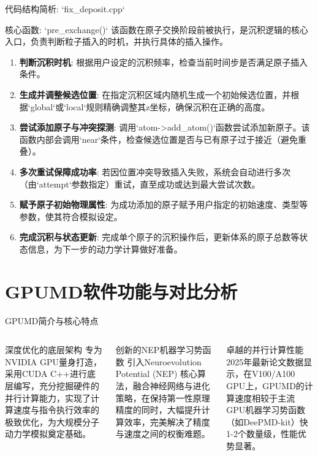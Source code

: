 \documentclass{beamer}
\begin{document}
\begin{frame}{代码结构简析: `fix_deposit.cpp`}
    \begin{block}{核心函数: `pre_exchange()`}
        该函数在原子交换阶段前被执行，是沉积逻辑的核心入口，负责判断粒子插入的时机，并执行具体的插入操作。
    \end{block}
    \begin{enumerate}
        \item \textbf{判断沉积时机}: 根据用户设定的沉积频率，检查当前时间步是否满足原子插入条件。
        \item \textbf{生成并调整候选位置}: 在指定沉积区域内随机生成一个初始候选位置，并根据`global`或`local`规则精确调整其z坐标，确保沉积在正确的高度。
        \item \textbf{尝试添加原子与冲突探测}: 调用`atom->add_atom()`函数尝试添加新原子。该函数内部会调用`near`条件，检查候选位置是否与已有原子过于接近（避免重叠）。
        \item \textbf{多次重试保障成功率}: 若因位置冲突导致插入失败，系统会自动进行多次（由`attempt`参数指定）重试，直至成功或达到最大尝试次数。
        \item \textbf{赋予原子初始物理属性}: 为成功添加的原子赋予用户指定的初始速度、类型等参数，使其符合模拟设定。
        \item \textbf{完成沉积与状态更新}: 完成单个原子的沉积操作后，更新体系的原子总数等状态信息，为下一步的动力学计算做好准备。
    \end{enumerate}
\end{frame}

\section{GPUMD软件功能与对比分析}

\begin{frame}{GPUMD简介与核心特点}
    \begin{columns}
        \begin{block}{深度优化的底层架构}
            专为NVIDIA GPU量身打造，采用CUDA C++进行底层编写，充分挖掘硬件的并行计算能力，实现了计算速度与指令执行效率的极致优化，为大规模分子动力学模拟奠定基础。
        \end{block}
        \begin{block}{创新的NEP机器学习势函数}
            引入Neuroevolution Potential (NEP) 核心算法，融合神经网络与进化策略，在保持第一性原理精度的同时，大幅提升计算效率，完美解决了精度与速度之间的权衡难题。
        \end{block}
        \begin{block}{卓越的并行计算性能}
            2025年最新论文数据显示，在V100/A100 GPU上，GPUMD的计算速度相较于主流GPU机器学习势函数（如DeePMD-kit）快1-2个数量级，性能优势显著。
        \end{block}
    \end{columns}
\end{frame}
\end{document}
